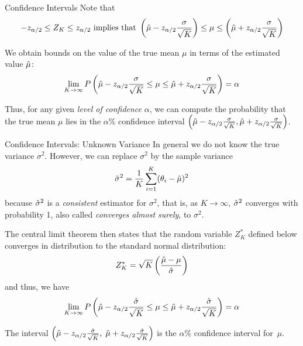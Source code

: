 \begin{frame}{Conf\/{i}dence Intervals}
Note that
\begin{align*}
  -z_{\alpha/2} \le Z_K \le z_{\alpha/2} 
  \text{ implies that }
  \left(\hat{\mu} - z_{\alpha/2}{\sigma \over \sqrt{K}}\right) \le \mu
  \le \left(\hat{\mu}+z_{\alpha/2}{\sigma \over \sqrt{K}}\right)
\end{align*}

\medskip
We obtain bounds on the value of the true mean $\mu$ in terms of the
estimated value $\hat{\mu}$:
\begin{align*}
  \lim_{K\to\infty} P\left(\hat{\mu} - z_{\alpha/2}{\sigma \over \sqrt{K}} \le \mu \le
  \hat{\mu} + z_{\alpha/2}{\sigma \over \sqrt{K}} \right) = \alpha
\end{align*}

\medskip
Thus, for any given {\em level of conf\/{i}dence} $\alpha$, we can compute
the probability that the true mean $\mu$ lies in the $\alpha\%$
conf\/{i}dence interval $\left(\hat{\mu} - z_{\alpha/2}{\sigma \over
\sqrt{K}}, \hat{\mu} + z_{\alpha/2}{\sigma \over \sqrt{K}}\right)$. 

\end{frame}



\begin{frame}{Confidence Intervals: Unknown Variance}
In general we do not know the 
  true variance
$\sigma^2$. However, we can replace $\sigma^2$ by
the sample variance
\begin{align*}
  \hat{\sigma}^2 = {1 \over K} \sum_{i=1}^K (\theta_i - \hat{\mu})^2
\end{align*}
because $\hat{\sigma}^2$ is a {\em consistent} estimator for
$\sigma^2$, that is, as $K\to\infty$, $\hat{\sigma}^2$ converges with
probability 1, also called {\em converges almost surely}, to
$\sigma^2$. 

\medskip
The central limit theorem then states that the random
variable $Z_K^*$ def\/{i}ned below converges in distribution to the
standard normal distribution:
\begin{align*}
  Z_K^* = \sqrt{K} \left({\hat{\mu} - \mu \over \hat{\sigma}}\right)
\end{align*}
and thus, we have
\begin{align*}
  \lim_{K\to\infty} P\left(\hat{\mu} - z_{\alpha/2}{\hat{\sigma} \over \sqrt{K}} \le \mu \le
  \hat{\mu} + z_{\alpha/2}{\hat{\sigma} \over \sqrt{K}} \right) = \alpha
\end{align*}

\medskip
The interval
$\left(\hat{\mu} - z_{\alpha/2}{\hat{\sigma} \over \sqrt{K}},\;
  \hat{\mu} + z_{\alpha/2}{\hat{\sigma} \over \sqrt{K}} \right)$ is the $\alpha\%$
  conf\/{i}dence interval for~$\mu$.
\end{frame}



